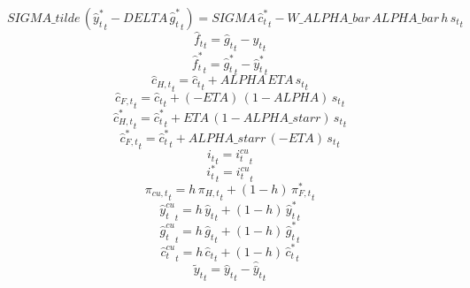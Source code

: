 \begin{dmath}
{SIGMA\_tilde}\, \left({{\hat y_t^*}}_{t}-{DELTA}\, {{\hat g_t^*}}_{t}\right)={SIGMA}\, {{\hat c_t^*}}_{t}-{W\_ALPHA\_bar}\, {ALPHA\_bar}\, {h}\, {{s_t}}_{t}
\end{dmath}
\begin{dmath}
{{\hat f_t}}_{t}={{\hat g_t}}_{t}-{{\hat y_t}}_{t}
\end{dmath}
\begin{dmath}
{{\hat f_t^*}}_{t}={{\hat g_t^*}}_{t}-{{\hat y_t^*}}_{t}
\end{dmath}
\begin{dmath}
{{\hat c_{H,t}}}_{t}={{\hat c_t}}_{t}+{ALPHA}\, {ETA}\, {{s_t}}_{t}
\end{dmath}
\begin{dmath}
{{\hat c_{F,t}}}_{t}={{\hat c_t}}_{t}+\left(-{ETA}\right)\, \left(1-{ALPHA}\right)\, {{s_t}}_{t}
\end{dmath}
\begin{dmath}
{{\hat c_{H,t}^*}}_{t}={{\hat c_t^*}}_{t}+{ETA}\, \left(1-{ALPHA\_starr}\right)\, {{s_t}}_{t}
\end{dmath}
\begin{dmath}
{{\hat c_{F,t}^*}}_{t}={{\hat c_t^*}}_{t}+{ALPHA\_starr}\, \left(-{ETA}\right)\, {{s_t}}_{t}
\end{dmath}
\begin{dmath}
{{i_t}}_{t}={{i_t^{cu}}}_{t}
\end{dmath}
\begin{dmath}
{{i_t^*}}_{t}={{i_t^{cu}}}_{t}
\end{dmath}
\begin{dmath}
{{\pi_{cu,t}}}_{t}={h}\, {{\pi_{H,t}}}_{t}+\left(1-{h}\right)\, {{\pi_{F,t}^*}}_{t}
\end{dmath}
\begin{dmath}
{{\hat y_t^{cu}}}_{t}={h}\, {{\hat y_t}}_{t}+\left(1-{h}\right)\, {{\hat y_t^*}}_{t}
\end{dmath}
\begin{dmath}
{{\hat g_t^{cu}}}_{t}={h}\, {{\hat g_t}}_{t}+\left(1-{h}\right)\, {{\hat g_t^*}}_{t}
\end{dmath}
\begin{dmath}
{{\hat c_t^{cu}}}_{t}={h}\, {{\hat c_t}}_{t}+\left(1-{h}\right)\, {{\hat c_t^*}}_{t}
\end{dmath}
\begin{dmath}
{{\tilde y_t}}_{t}={{\hat y_t}}_{t}-{{\hat {\bar y}_t}}_{t}
\end{dmath}
